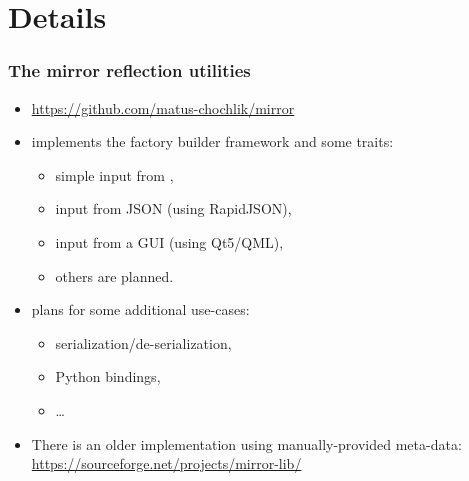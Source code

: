 \documentclass[compress,table,xcolor=table]{beamer}
\begin{document}
\section{Details}
\begin{frame}[fragile]
\frametitle{The mirror reflection utilities}
    \Large
    \begin{itemize}
        \item \url{https://github.com/matus-chochlik/mirror}
        \item implements the factory builder framework and some traits:
        \begin{itemize}
            \large
            \item simple input from \verb@iostreams@,
            \item input from JSON (using RapidJSON),
            \item input from a GUI (using Qt5/QML),
            \item others are planned.
        \end{itemize}
        \item plans for some additional use-cases:
        \begin{itemize}
            \large
            \item serialization/de-serialization,
            \item Python bindings,
            \item \ldots
        \end{itemize}
        \item There is an older implementation using manually-provided meta-data:
            \url{https://sourceforge.net/projects/mirror-lib/}
    \end{itemize}
\end{frame}
\end{document}

